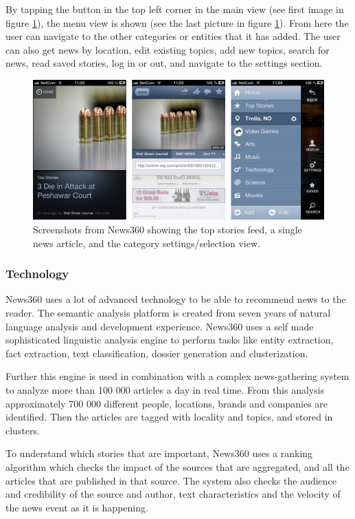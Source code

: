 By tapping the button in the top left corner in the main view (see first image in figure \ref{screenshots_news360}), the menu view is shown (see the last picture in figure \ref{screenshots_news360}). From here the user can navigate to the other categories or entities that it has added. The user can also get news by location, edit existing topics, add new topics, search for news, read saved stories, log in or out, and navigate to the settings section.


\begin{figure}[!htbp]
\centering
\includegraphics[width=130mm]{GFX/screenshots/news360.png}
\caption{Screenshots from News360 showing the top stories feed, a single news article, and the category settings/selection view.}
\label{screenshots_news360}
\end{figure}

\subsubsection{Technology}
News360 uses a lot of advanced technology to be able to recommend news to the reader\cite{news360_technology}. The semantic analysis platform is created from seven years of natural language analysis and development experience. News360 uses a self made sophisticated linguistic analysis engine to perform tasks like entity extraction, fact extraction, text classification, dossier generation and clusterization.

Further this engine is used in combination with a complex news-gathering system to analyze more than 100 000 articles a day in real time. From this analysis approximately 700 000 different people, locations, brands and companies are identified. Then the articles are tagged with locality and topics, and stored in clusters.

To understand which stories that are important, News360 uses a ranking algorithm which checks the impact of the sources that are aggregated, and all the articles that are published in that source. The system also checks the audience and credibility of the source and author, text characteristics and the velocity of the news event as it is happening.

